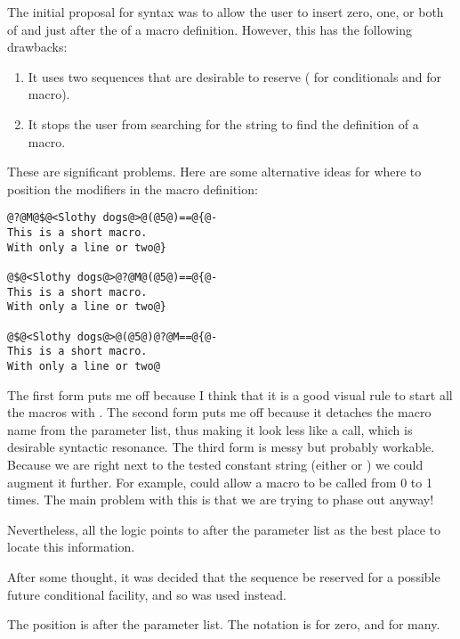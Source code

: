 The initial proposal for syntax was to allow the user to insert zero, one,
or both of  and  just after the  of a macro definition.
However, this has the following drawbacks:

\begin{enumerate}

\item It uses two sequences that are desirable to reserve
      ( for conditionals and  for macro).

\item It stops the user from searching for the string  to find
      the definition of a macro.
      
\end{enumerate}

These are significant problems.
Here are some alternative
ideas for where to position the modifiers in the macro definition:

\begin{verbatim}
@?@M@$@<Slothy dogs@>@(@5@)==@{@-
This is a short macro.
With only a line or two@}

@$@<Slothy dogs@>@?@M@(@5@)==@{@-
This is a short macro.
With only a line or two@}

@$@<Slothy dogs@>@(@5@)@?@M==@{@-
This is a short macro.
With only a line or two@
\end{verbatim}

The first form puts me off because I think that it is a good visual rule
to start all the macros with . The second form puts me off because it
detaches the macro name from the parameter list, thus making it look
less like a call, which is desirable syntactic resonance. The third form
is messy but probably workable. Because we are right next to the tested
constant string (either \p{==} or \p{+=}) we could augment it further. For
example,  could allow a macro to be called from 0 to 1 times.
The main problem with this is that we are trying to phase out \p{==} anyway!

Nevertheless, all the logic points to after the parameter list as the best
place to locate this information.

After some thought, it was decided that the  sequence be reserved
for a possible future conditional facility, and so  was used
instead.

 The position is after the parameter list. The notation
is  for zero, and  for many.

